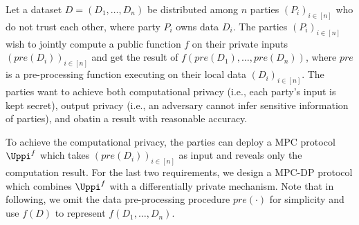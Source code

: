 Let a dataset $D=\left( D_{1},\ldots, D_{n}\right) $ be distributed among $n$ parties $\left( P_{i}\right) _{i\in \left[ n\right] }$ who do not trust each other, where party $P_{i}$ owns data $D_{i}$. The parties $\left(P_{i}\right)_{i \in \left[ n\right]} $ wish to jointly compute a public function $f$ on their private inputs $\left(pre\left(D_i\right)\right)_{i \in \left[ n\right]} $ and get the result of $f\left(pre\left(D_1\right),\ldots,pre\left(D_n\right)\right)$, where $pre$ is a pre-processing function executing on their local data $\left(D_i\right)_{i \in \left[ n\right]} $. The parties want to achieve both computational privacy (i.e., each party's input is kept secret), output privacy (i.e., an adversary cannot infer sensitive information of parties), and obatin a result with reasonable accuracy.

To achieve the computational privacy, the parties can deploy a MPC protocol $\Uppi^{f}$ which takes $\left(pre\left(D_i\right)\right)_{i \in \left[ n\right]} $ as input and reveals only the computation result. For the last two requirements, we design a MPC-DP protocol which combines $\Uppi^{f}$ with a differentially private mechanism. Note that in following, we omit the data pre-processing procedure $pre\left(\cdot\right) $ for simplicity and use $f\left( D\right)$ to represent $f\left(D_1,\ldots,D_n\right)$.

